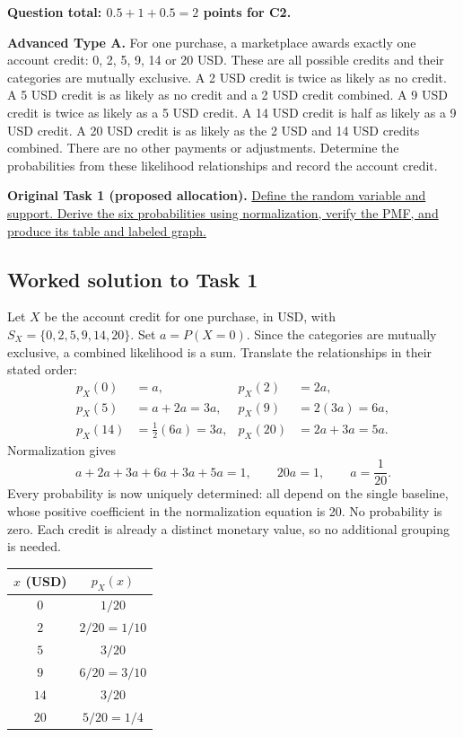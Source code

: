 \par\vspace{3mm}\secInicio[][sec:q4]

\textbf{Question total: $0.5+1+0.5=2$ points for C2.}

\clearpage
{}

\textbf{Advanced Type A.} For one purchase, a marketplace awards exactly one account credit: 0, 2, 5, 9, 14 or 20 USD. These are all possible credits and their categories are mutually exclusive. A 2 USD credit is twice as likely as no credit. A 5 USD credit is as likely as no credit and a 2 USD credit combined. A 9 USD credit is twice as likely as a 5 USD credit. A 14 USD credit is half as likely as a 9 USD credit. A 20 USD credit is as likely as the 2 USD and 14 USD credits combined. There are no other payments or adjustments. Determine the probabilities from these likelihood relationships and record the account credit.

\textbf{Original Task 1 (proposed allocation).} \hyperref[sol:q5t1]{Define the random variable and support. Derive the six probabilities using normalization, verify the PMF, and produce its table and labeled graph.} 


\subsection*{Worked solution to Task 1 }
\label{sol:q5t1}

Let $X$ be the account credit for one purchase, in USD, with $S_X=\{0,2,5,9,14,20\}$. Set $a=P(X=0)$. Since the categories are mutually exclusive, a combined likelihood is a sum. Translate the relationships in their stated order:
\begin{align*}
p_X(0)&=a,&p_X(2)&=2a,\\
p_X(5)&=a+2a=3a,&p_X(9)&=2(3a)=6a,\\
p_X(14)&=\tfrac12(6a)=3a,&p_X(20)&=2a+3a=5a.
\end{align*}
Normalization gives
\[
a+2a+3a+6a+3a+5a=1,\qquad 20a=1,\qquad a=\frac1{20}.
\]
Every probability is now uniquely determined: all depend on the single baseline, whose positive coefficient in the normalization equation is 20. No probability is zero. Each credit is already a distinct monetary value, so no additional grouping is needed.

\begin{center}
\begin{tabular}{cc}\toprule
$x$ (USD) & $p_X(x)$\\\midrule
$0$ & $1/20$\\
$2$ & $2/20=1/10$\\
$5$ & $3/20$\\
$9$ & $6/20=3/10$\\
$14$ & $3/20$\\
$20$ & $5/20=1/4$\\
\bottomrule\end{tabular}
\end{center}


